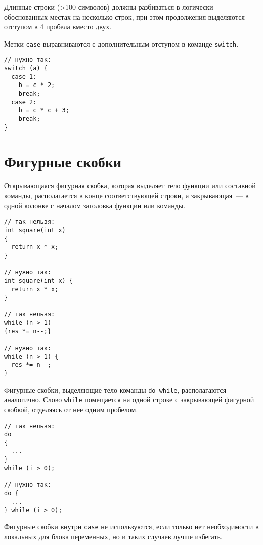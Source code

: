 \zzstyleitem

Длинные строки (\textgreater{}100 символов) должны разбиваться в
логически обоснованных местах на несколько строк, при этом продолжения
выделяются отступом в 4 пробела вместо двух.

\zzstyleitem

Метки \texttt{case} выравниваются с дополнительным отступом в команде
\texttt{switch}.

\begin{verbatim}
// нужно так:
switch (a) {
  case 1:
    b = c * 2;
    break;
  case 2:
    b = c * c + 3;
    break;
}
\end{verbatim}


\section{Фигурные скобки}


\zzstyleitem

Открывающаяся фигурная скобка, которая выделяет тело функции или составной команды,
располагается в конце соответствующей строки, а закрывающая~--- в одной колонке
с началом заголовка функции или команды.

\begin{verbatim}
// так нельзя:
int square(int x)
{
  return x * x; 
}

// нужно так:
int square(int x) {
  return x * x;
}

// так нельзя:
while (n > 1)
{res *= n--;}

// нужно так:
while (n > 1) {
  res *= n--;
}
\end{verbatim}

\zzstyleitem

Фигурные скобки, выделяющие тело команды \texttt{do-while},
располагаются аналогично.
Слово \texttt{while} помещается на одной строке с закрывающей фигурной
скобкой, отделяясь от нее одним пробелом.

\begin{verbatim}
// так нельзя:
do
{
  ...
}
while (i > 0);

// нужно так:
do {
  ...
} while (i > 0);
\end{verbatim}

\zzstyleitem

Фигурные скобки внутри \texttt{case} не используются, если только нет
необходимости в локальных для блока переменных, но и таких случаев лучше
избегать.

